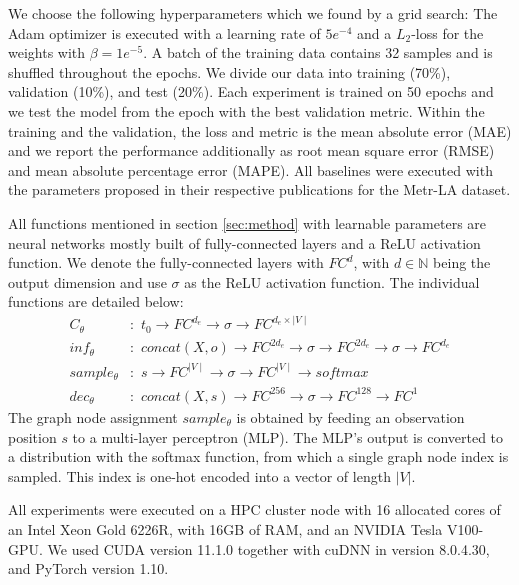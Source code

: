 We choose the following hyperparameters which we found by a grid search: 
The Adam optimizer \cite{kingma2014adam} is executed with a learning rate of $5e^{-4}$ and a $L_2$-loss for the weights with $\beta = 1e^{-5}$.
A batch of the training data contains 32 samples and is shuffled throughout the epochs.
We divide our data into training (70\%), validation (10\%), and test (20\%).
Each experiment is trained on 50 epochs and we test the model from the epoch with the best validation metric.
Within the training and the validation, the loss and metric is the mean absolute error (MAE) and we report the performance additionally as root mean square error (RMSE) and mean absolute percentage error (MAPE).
All baselines were executed with the parameters proposed in their respective publications for the Metr-LA dataset.

All functions mentioned in section \ref{sec:method} with learnable parameters are neural networks mostly built of fully-connected layers and a ReLU \cite{nair2010rectified} activation function.
We denote the fully-connected layers with $FC^d$, with $d \in \mathbb{N}$ being the output dimension and use $\sigma$ as the ReLU activation function.
The individual functions are detailed below:
\begin{align*}
    C_{\theta} & : \,\, t_0 \to FC^{d_e} \to \sigma \to FC^{d_e \times \mid V \mid} \\
    inf_{\theta} & : \,\, concat(X,o) \to FC^{2d_e} \to \sigma \to FC^{2d_e}\to \sigma \to FC^{d_e}\\
    sample_{\theta} & : \,\, s\to FC^{\mid V \mid} \to \sigma \to FC^{\mid V \mid}\to softmax\\
    dec_{\theta} & : \,\, concat(X,s) \to FC^{256} \to \sigma \to FC^{128} \to FC^1 
\end{align*}
The graph node assignment $sample_{\theta}$ is obtained by feeding an observation position $s$ to a multi-layer perceptron (MLP).
The MLP's output is converted to a distribution with the softmax function, from which a single graph node index is sampled.
This index is one-hot encoded into a vector of length $|V|$.

All experiments were executed on a HPC cluster node with 16 allocated cores of an Intel Xeon Gold 6226R, with 16GB of RAM, and an NVIDIA Tesla V100-GPU.
We used CUDA version 11.1.0 together with cuDNN in version 8.0.4.30, and PyTorch version 1.10.



